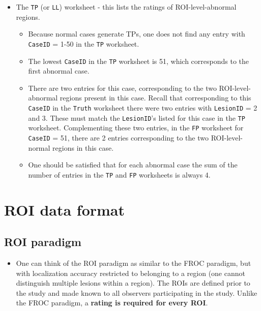 \documentclass[]{book}
\providecommand{\tightlist}{%
  \setlength{\itemsep}{0pt}\setlength{\parskip}{0pt}}
\begin{document}
\begin{itemize}
\tightlist
\item
  The \texttt{TP} (or \texttt{LL}) worksheet - this lists the ratings of ROI-level-abnormal regions.

  \begin{itemize}
  \tightlist
  \item
    Because normal cases generate TPs, one does not find any entry with \texttt{CaseID} = 1-50 in the \texttt{TP} worksheet.\\
  \item
    The lowest \texttt{CaseID} in the \texttt{TP} worksheet is 51, which corresponds to the first abnormal case.\\
  \item
    There are two entries for this case, corresponding to the two ROI-level-abnormal regions present in this case. Recall that corresponding to this \texttt{CaseID} in the \texttt{Truth} worksheet there were two entries with \texttt{LesionID} = 2 and 3. These must match the \texttt{LesionID}'s listed for this case in the \texttt{TP} worksheet. Complementing these two entries, in the \texttt{FP} worksheet for \texttt{CaseID} = 51, there are 2 entries corresponding to the two ROI-level-normal regions in this case.\\
  \item
    One should be satisfied that for each abnormal case the sum of the number of entries in the \texttt{TP} and \texttt{FP} worksheets is always 4.
  \end{itemize}
\end{itemize}

\hypertarget{roidataformat}{%
\chapter{ROI data format}\label{roidataformat}}

\hypertarget{roi-paradigm}{%
\section{ROI paradigm}\label{roi-paradigm}}

\begin{itemize}
\tightlist
\item
  One can think of the ROI paradigm as similar to the FROC paradigm, but with localization accuracy restricted to belonging to a region (one cannot distinguish multiple lesions within a region). The ROIs are defined prior to the study and made known to all observers participating in the study. Unlike the FROC paradigm, a \textbf{rating is required for every ROI}.
\end{itemize}


\end{document}
